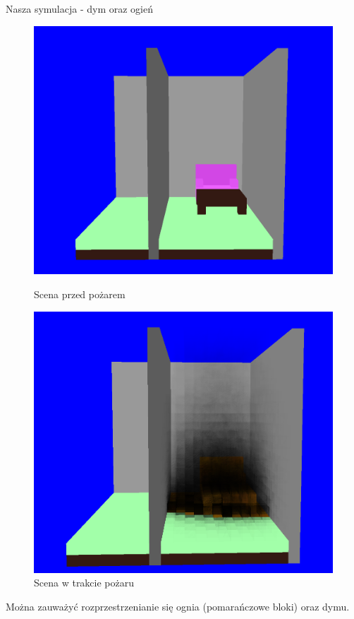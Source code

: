 \documentclass{beamer}
\begin{document}
\begin{frame}{Nasza symulacja - dym oraz ogień}
\begin{figure}[htbp]
  \centering
  \begin{minipage}{.45\textwidth}
    \includegraphics[width=\textwidth]{3.png}
    \caption{Scena przed pożarem}
    \label{fig:image3}
  \end{minipage}%
  \hfill
  \begin{minipage}{.45\textwidth}
    \includegraphics[width=\textwidth]{4.png}
    \caption{Scena w trakcie pożaru}
    \label{fig:image4}
  \end{minipage}
\end{figure}

Można zauważyć rozprzestrzenianie się ognia (pomarańczowe bloki) oraz dymu.
\end{frame}
\end{document}
